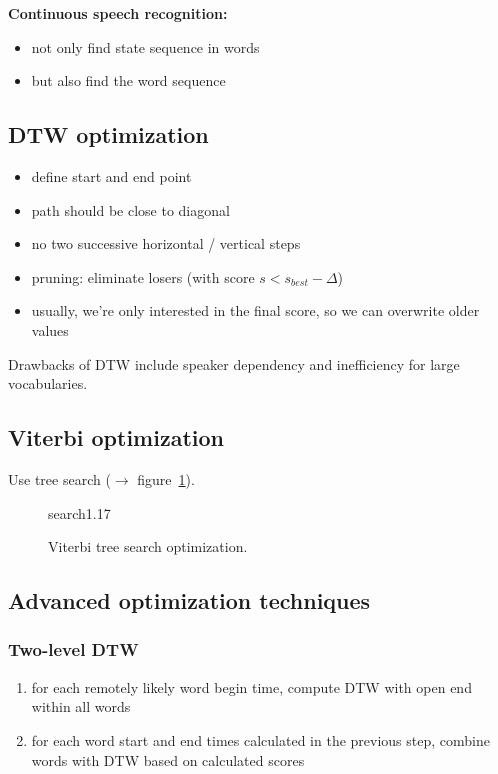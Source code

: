 \vspace{5pt}

\textbf{Continuous speech recognition:}
\begin{itemize}
    \item not only find state sequence in words
    \item but also find the word sequence
\end{itemize}

\vspace{5pt}

\subsection{DTW optimization}
\begin{itemize}
    \item define start and end point
    \item path should be close to diagonal
    \item no two successive horizontal / vertical steps
    \item pruning: eliminate losers (with score $s < s_{best} - \Delta$)
    \item usually, we're only interested in the final score, so we can overwrite older values
\end{itemize}

Drawbacks of DTW include speaker dependency and inefficiency for large vocabularies.

\subsection{Viterbi optimization}
Use tree search ($\to$ figure~\ref{fig:viterbiTreeSearchOptimization}).
\begin{figure}[htb]
    \begin{minipage}{\linewidth}
        \vspace{5cm}
        \hfill \scriptsize search1.17
    \end{minipage}
    \caption{\label{fig:viterbiTreeSearchOptimization} Viterbi tree search optimization.}
\end{figure}

\subsection{Advanced optimization techniques}

\subsubsection{Two-level DTW}
\begin{enumerate}
    \item for each remotely likely word begin time, compute DTW with open end within all words
    \item for each word start and end times calculated in the previous step, combine words with DTW based on calculated scores
\end{enumerate}

